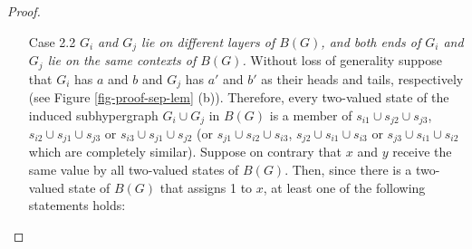 \documentclass[%
12pt,
prereprint,
showpacs,
showkeys,
preprintnumbers,
amsmath,amssymb,
aps,
pra,
longbibliography,
notitlepage
]{revtex4-1}
\theoremstyle{definition}
\begin{document}
\begin{proof}
\begin{itemize}
\begin{itemize}
                                \item[Case 2.2] \emph{$G_i$ and $G_j$ lie on different layers of $B(G)$, and both ends of $G_i$ and $G_j$ lie on the same contexts of $B(G)$.} Without loss of generality suppose that $G_i$ has $a$ and $b$ and $G_j$ has $a'$ and $b'$ as their heads and tails, respectively (see Figure \ref{fig-proof-sep-lem} (b)). Therefore, every two-valued state of the induced subhypergraph $G_i \cup G_j$ in $B(G)$ is a member of $s_{i1} \cup s_{j2}\cup s_{j3}$, $s_{i2} \cup s_{j1}\cup s_{j3}$ or $s_{i3}\cup s_{j1}\cup s_{j2}$ (or $s_{j1} \cup s_{i2}\cup s_{i3}$, $s_{j2} \cup s_{i1}\cup s_{i3}$ or $s_{j3}\cup s_{i1}\cup s_{i2}$ which are completely similar). Suppose on contrary that $x$ and $y$ receive the same value by all two-valued states of $B(G)$. Then, since there is a two-valued state of $B(G)$ that assigns 1 to $x$, at least one of the following statements holds:


\end{itemize}
\end{itemize}
\end{proof}
\end{document}
